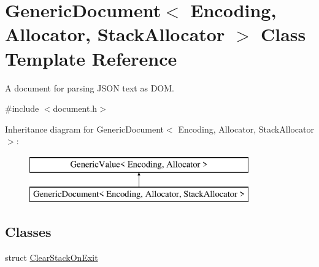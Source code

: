 \hypertarget{class_generic_document}{}\section{Generic\+Document$<$ Encoding, Allocator, Stack\+Allocator $>$ Class Template Reference}
\label{class_generic_document}


A document for parsing J\+S\+ON text as D\+OM.  




{\ttfamily \#include $<$document.\+h$>$}

Inheritance diagram for Generic\+Document$<$ Encoding, Allocator, Stack\+Allocator $>$\+:\begin{figure}[H]
\begin{center}
\leavevmode
\includegraphics[height=2.000000cm]{class_generic_document}
\end{center}
\end{figure}
\subsection*{Classes}
\begin{DoxyCompactItemize}
\item 
struct \hyperlink{struct_generic_document_1_1_clear_stack_on_exit}{Clear\+Stack\+On\+Exit}
\end{DoxyCompactItemize}
